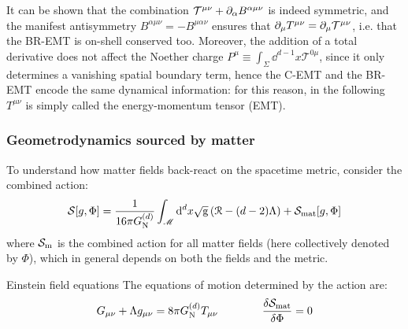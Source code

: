 It can be shown that the combination $ \mathcal{T}^{\mu \nu} + \partial_\alpha B^{\alpha \mu \nu} $ is indeed symmetric, and the manifest antisymmetry $ B^{\alpha \mu \nu} = - B^{\mu \alpha \nu} $ ensures that $ \partial_\mu T^{\mu \nu} = \partial_\mu \mathcal{T}^{\mu \nu} $, i.e. that the BR-EMT is on-shell conserved too. Moreover, the addition of a total derivative does not affect the Noether charge $ P^\mu \equiv \int_\Sigma \dd^{d-1}x \mathcal{T}^{0\mu} $, since it only determines a vanishing spatial boundary term, hence the C-EMT and the BR-EMT encode the same dynamical information: for this reason, in the following $ T^{\mu \nu} $ is simply called the energy-momentum tensor (EMT).


\subsubsection{Geometrodynamics sourced by matter}

To understand how matter fields back-react on the spacetime metric, consider the combined action:
\begin{equation}
  \mathcal{S}[g,\Phi] = \frac{1}{16\pi G_\text{N}^{(d)}} \int_\mathscr{M} \mathrm{d}^d x \sqrt{\mathrm{g}} \left( \EuScript{R} - (d - 2) \Lambda \right) + \mathcal{S}_\text{mat}[g,\Phi]
  \label{eq:gravity-matter-action}
\end{equation}
where $ \mathcal{S}_\text{m} $ is the combined action for all matter fields (here collectively denoted by $ \Phi $), which in general depends on both the fields and the metric.

\begin{proposition}{Einstein field equations}{}
  The equations of motion determined by the action  are:
  \begin{equation}
    G_{\mu \nu} + \Lambda g_{\mu \nu} = 8\pi G_\text{N}^{(d)} T_{\mu \nu}
    \qquad \qquad
    \frac{\delta \mathcal{S}_\text{mat}}{\delta \Phi} = 0
    \label{eq:ef-eq}
  \end{equation}
\end{proposition}

